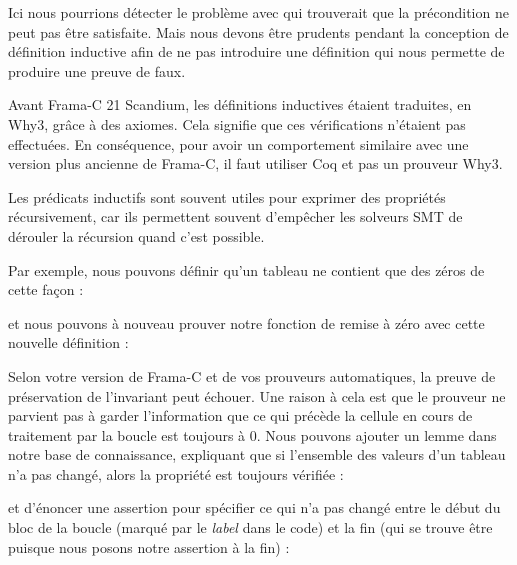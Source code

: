 Ici nous pourrions détecter le problème avec  qui
trouverait que la précondition ne peut pas être satisfaite. Mais nous devons
être prudents pendant la conception de définition inductive afin de ne pas
introduire une définition qui nous permette de produire une preuve de faux.


\begin{Warning}
  Avant Frama-C 21 Scandium, les définitions inductives étaient traduites,
  en Why3, grâce à des axiomes. Cela signifie que ces vérifications n'étaient
  pas effectuées. En conséquence, pour avoir un comportement similaire avec
  une version plus ancienne de Frama-C, il faut utiliser Coq et pas un prouveur
  Why3.
\end{Warning}



Les prédicats inductifs sont souvent utiles pour exprimer des propriétés
récursivement, car ils permettent souvent d'empêcher les solveurs SMT de
dérouler la récursion quand c'est possible.


Par exemple, nous pouvons définir qu'un tableau ne contient que des zéros de
cette façon :




et nous pouvons à nouveau prouver notre fonction de remise à zéro avec cette
nouvelle définition :






Selon votre version de Frama-C et de vos prouveurs automatiques, la preuve de
préservation de l'invariant peut échouer. Une raison à cela est que le prouveur ne
parvient pas à garder l'information que ce qui précède la cellule en cours de
traitement par la boucle est toujours à 0. Nous pouvons ajouter un lemme dans
notre base de connaissance, expliquant que si l'ensemble des valeurs d'un tableau
n'a pas changé, alors la propriété est toujours vérifiée :






et d'énoncer une assertion pour spécifier ce qui n'a pas changé entre le début
du bloc de la boucle (marqué par le \textit{label}  dans le code)
et la fin (qui se trouve être  puisque nous posons notre
assertion à la fin) :



